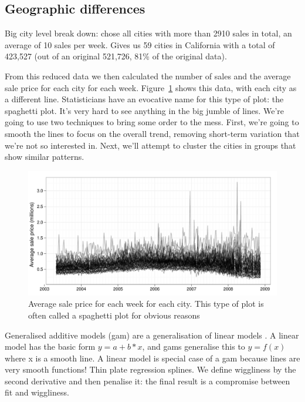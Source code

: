 \documentclass[oneside]{article}
\begin{document}
\subsection{Geographic differences}

Big city level break down: chose all cities with more than 2910 sales in total, an average of 10 sales per week.  Gives us 59 cities in California with a total of 423,527 (out of an original 521,726, 81\% of the original data).  

% 

From this reduced data we then calculated the number of sales and the average sale price for each city for each week.  Figure~\ref{fig:spaghetti} shows this data, with each city as a different line.  Statisticians have an evocative name for this type of plot: the spaghetti plot.  It's very hard to see anything in the big jumble of lines.  We're going to use two techniques to bring some order to the mess.  First, we're going to smooth the lines to focus on the overall trend, removing short-term variation that we're not so interested in.  Next, we'll attempt to cluster the cities in groups that show similar patterns.

\begin{figure}[htbp]
  \centering
    \includegraphics[width=\linewidth]{cities-price}
  \caption{Average sale price for each week for each city.  This type of plot is often called a spaghetti plot for obvious reasons}
  \label{fig:spaghetti}
\end{figure}

Generalised additive models ({\sc gam}) are a generalisation of linear models \citep{wood:2006}.  A linear model has the basic form $y = a + b * x$, and {\sc gam}s generalise this to $y = f(x)$ where x is a smooth line.  A linear model is special case of a {\sc gam} because lines are very smooth functions!  Thin plate regression splines.  We define wiggliness by the second derivative and then penalise it: the final result is a compromise between fit and wiggliness.
\end{document}
